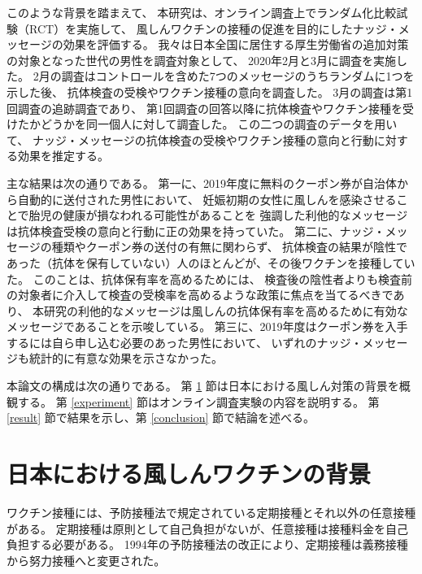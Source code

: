 \documentclass[
  11pt,
  a4paper,
]{article}
\begin{document}
このような背景を踏まえて、
本研究は、オンライン調査上でランダム化比較試験（RCT）を実施して、
風しんワクチンの接種の促進を目的にしたナッジ・メッセージの効果を評価する。
我々は日本全国に居住する厚生労働省の追加対策の対象となった世代の男性を調査対象として、
2020年2月と3月に調査を実施した。
2月の調査はコントロールを含めた7つのメッセージのうちランダムに1つを示した後、
抗体検査の受検やワクチン接種の意向を調査した。
3月の調査は第1回調査の追跡調査であり、
第1回調査の回答以降に抗体検査やワクチン接種を受けたかどうかを同一個人に対して調査した。
この二つの調査のデータを用いて、
ナッジ・メッセージの抗体検査の受検やワクチン接種の意向と行動に対する効果を推定する。

主な結果は次の通りである。
第一に、2019年度に無料のクーポン券が自治体から自動的に送付された男性において、
妊娠初期の女性に風しんを感染させることで胎児の健康が損なわれる可能性があることを
強調した利他的なメッセージは抗体検査受検の意向と行動に正の効果を持っていた。
第二に、ナッジ・メッセージの種類やクーポン券の送付の有無に関わらず、
抗体検査の結果が陰性であった（抗体を保有していない）人のほとんどが、その後ワクチンを接種していた。
このことは、抗体保有率を高めるためには、
検査後の陰性者よりも検査前の対象者に介入して検査の受検率を高めるような政策に焦点を当てるべきであり、
本研究の利他的なメッセージは風しんの抗体保有率を高めるために有効なメッセージであることを示唆している。
第三に、2019年度はクーポン券を入手するには自ら申し込む必要のあった男性において、
いずれのナッジ・メッセージも統計的に有意な効果を示さなかった。

本論文の構成は次の通りである。
第 \ref{background} 節は日本における風しん対策の背景を概観する。
第 \ref{experiment} 節はオンライン調査実験の内容を説明する。
第 \ref{result} 節で結果を示し、第 \ref{conclusion} 節で結論を述べる。

\hypertarget{background}{%
\section{日本における風しんワクチンの背景}\label{background}}

ワクチン接種には、予防接種法で規定されている定期接種とそれ以外の任意接種がある。
定期接種は原則として自己負担がないが、任意接種は接種料金を自己負担する必要がある。
1994年の予防接種法の改正により、定期接種は義務接種から努力接種へと変更された。
\end{document}
